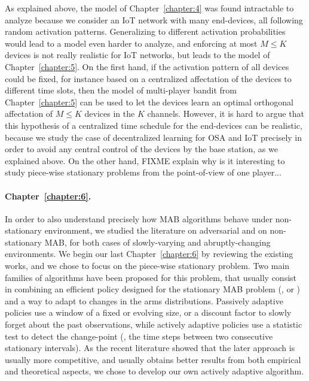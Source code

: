 
As explained above, the model of Chapter~\ref{chapter:4} was found intractable to analyze because we consider an IoT network with many end-devices, all following random activation patterns.
Generalizing to different activation probabilities would lead to a model even harder to analyze, and enforcing at most $M \leq K$ devices is not really realistic for IoT networks, but leads to the model of Chapter~\ref{chapter:5}.
%
On the first hand, if the activation pattern of all devices could be fixed, for instance based on a centralized affectation of the devices to different time slots, then the model of multi-player bandit from Chapter~\ref{chapter:5} can be used to let the devices learn an optimal orthogonal affectation of $M \leq K$ devices in the $K$ channels.
However, it is hard to argue that this hypothesis of a centralized time schedule for the end-devices can be realistic, because we study the case of decentralized learning for OSA and IoT precisely in order to avoid any central control of the devices by the base station, as we explained above.
%
On the other hand,
FIXME explain why is it interesting to study piece-wise stationary problems from the point-of-view of one player...


\paragraph{Chapter~\ref{chapter:6}.}
%
%
In order to also understand precisely how MAB algorithms behave under non-stationary environment, we studied the literature on adversarial and on non-stationary MAB, for both cases of slowly-varying and abruptly-changing environments.
We begin our last Chapter~\ref{chapter:6} by reviewing the existing works,
and we chose to focus on the piece-wise stationary problem.
Two main families of algorithms have been proposed for this problem,
that usually consist in combining an efficient policy designed for the stationary MAB problem (\eg, \UCB{} or \klUCB) and a way to adapt to changes in the arms distributions.
Passively adaptive policies use a window of a fixed or evolving size, or a discount factor to slowly forget about the past observations,
while actively adaptive policies use a statistic test to detect the change-point (\ie, the time steps between two consecutive stationary intervals).
As the recent literature showed that the later approach is usually more competitive, and usually obtains better results from both empirical and theoretical aspects, we chose to develop our own actively adaptive algorithm.


